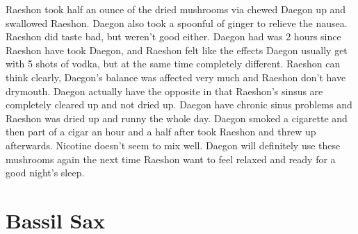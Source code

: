 \documentclass[12pt]{book}
\begin{document}
Raeshon took half an ounce of the dried mushrooms via chewed Daegon up and swallowed Raeshon. Daegon also took a spoonful of ginger to relieve the nausea. Raeshon did taste bad, but weren't good either. Daegon had was 2 hours since Raeshon have took Daegon, and Raeshon felt like the effects Daegon usually get with 5 shots of vodka, but at the same time completely different. Raeshon can think clearly, Daegon's balance was affected very much and Raeshon don't have drymouth. Daegon actually have the opposite in that Raeshon's sinsus are completely cleared up and not dried up. Daegon have chronic sinus problems and Raeshon was dried up and runny the whole day. Daegon smoked a cigarette and then part of a cigar an hour and a half after took Raeshon and threw up afterwards. Nicotine doesn't seem to mix well. Daegon will definitely use these mushrooms again the next time Raeshon want to feel relaxed and ready for a good night's sleep.



\chapter{Bassil Sax}
\end{document}
